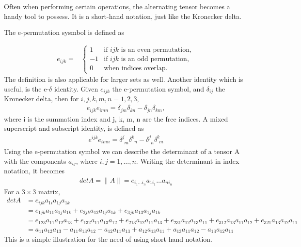 \documentclass[main.tex]{subfiles}
\begin{document}
Often when performing certain operations, the alternating tensor becomes a handy tool to
possess. It is a short-hand notation, just like the Kronecker delta. 
\begin{mydef}
The e-permutation sysmbol is defined as 
\end{mydef}
\begin{align*}
e_{ijk} = &
\left\{\begin{matrix}
 1 & \mbox{if }  ijk \mbox{ is an even permutation}, \\
-1 & \mbox{if } ijk \mbox{ is an odd permutation}, \\
 0 & \mbox{when indices overlap}.
\end{matrix}\right.
\end{align*}
The definition is also applicable for larger sets as well. 
Another identity which is useful, is the e-$\delta$ identity. Given $e_{ijk}$ the 
e-permutation symbol, and $\delta_{ij}$ the Kronecker delta, then for $i, j, k, m, n = 
1, 2, 3$,
\begin{align*}
e_{ijk} e_{imn} = \delta_{jm} \delta_{kn} - \delta_{jn} \delta_{km},
\end{align*}
where i is the summation index and j, k, m, n are the free indices. A mixed superscript
and subscript identity, is defined as
\begin{align*}
e^{ijk} e_{imn} = \delta^j_{\phantom{j}m} \delta^k_{\phantom{k}n} - 
			   \delta^j_{\phantom{j}n} \delta^k_{\phantom{j}m}
\end{align*}
Using the e-permutation symbol we can describe the determinant of a tensor A with the
components  $a_{ij}$, where $i, j = 1, \dots, n$. Writing the determinant in index notation, 
it becomes
\begin{align*}
det A = \|A\| = e_{{i_1}\dots{i_n}} a_{1{i_1}}\dots a_{n{i_n}}
\end{align*} 
For a $3\times3$ matrix,
\begin{align*}
det A &= e_{ijk} a_{1i}a_{1j}a_{1k} \\
	 &= e_{1jk} a_{11}a_{1j}a_{1k} + e_{2jk} a_{12}a_{1j}a_{1k} + e_{3jk} a_{13}a_{1j}a_{1k} \\
         &= e_{123} a_{11}a_{12}a_{13} + e_{132} a_{11}a_{13}a_{12}
	    + e_{213} a_{12}a_{11}a_{13}  + e_{231} a_{12}a_{13}a_{11}
	    + e_{312} a_{13}a_{11}a_{12} + e_{321} a_{13}a_{12}a_{11} \\
	&= a_{11}a_{12}a_{13} - a_{11}a_{13}a_{12}
	     - a_{12}a_{11}a_{13}  + a_{12}a_{13}a_{11}
	    + a_{13}a_{11}a_{12} - a_{13}a_{12}a_{11}
\end{align*} 
This is a simple illustration for the need of using short hand notation.
\end{document}
